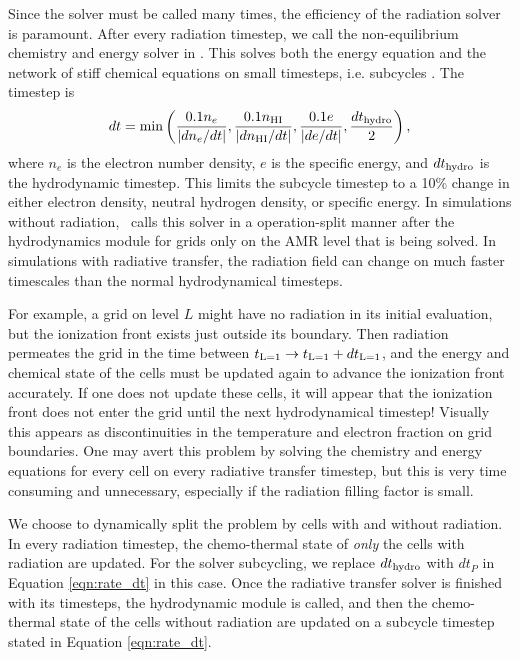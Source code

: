 \documentclass[12pt,preprint]{aastex}
\begin{document}
Since the solver must be called many times, the efficiency of the
radiation solver is paramount.  After every radiation timestep, we
call the non-equilibrium chemistry and energy solver in \enzo.  This
solves both the energy equation and the network of stiff chemical
equations on small timesteps, i.e. subcycles \citep{Anninos97}.  The
timestep is
%
\begin{equation}
  \label{eqn:rate_dt}
  dt = \min\left(
    \frac{0.1n_e}{|dn_e/dt|}, 
    \frac{0.1n_{\rm HI}}{|dn_{\rm HI}/dt|}, 
    \frac{0.1e}{|de/dt|}, 
    \frac{dt_{\rm hydro}}{2}\right),
\end{equation}
where $n_e$ is the electron number density, $e$ is the specific
energy, and $dt_{\rm hydro}$ is the hydrodynamic timestep.  This
limits the subcycle timestep to a 10\% change in either electron
density, neutral hydrogen density, or specific energy.  In simulations
without radiation, \enzo~calls this solver in a operation-split manner
after the hydrodynamics module for grids only on the AMR level that is
being solved.  In simulations with radiative transfer, the radiation
field can change on much faster timescales than the normal
hydrodynamical timesteps.

For example, a grid on level $L$ might have no radiation in its
initial evaluation, but the ionization front exists just outside its
boundary.  Then radiation permeates the grid in the time between
$t_{\rm L=1} \rightarrow t_{\rm L=1}+dt_{\rm L=1}$, and the energy and
chemical state of the cells must be updated again to advance the
ionization front accurately.  If one does not update these cells, it
will appear that the ionization front does not enter the grid until
the next hydrodynamical timestep!  Visually this appears as
discontinuities in the temperature and electron fraction on grid
boundaries.  One may avert this problem by solving the chemistry and
energy equations for every cell on every radiative transfer timestep,
but this is very time consuming and unnecessary, especially if the
radiation filling factor is small.

We choose to dynamically split the problem by cells with and without
radiation.  In every radiation timestep, the chemo-thermal state of
\textit{only} the cells with radiation are updated.  For the solver
subcycling, we replace $dt_{\rm hydro}$ with $dt_P$ in Equation
\ref{eqn:rate_dt} in this case.  Once the radiative transfer solver is
finished with its timesteps, the hydrodynamic module is called, and
then the chemo-thermal state of the cells without radiation are
updated on a subcycle timestep stated in Equation \ref{eqn:rate_dt}.
\end{document}
